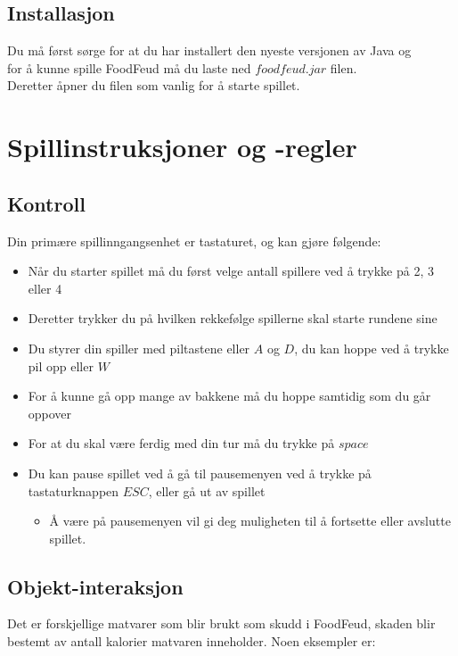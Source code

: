 \documentclass[paper=a4]{article}
\begin{document}
\subsection{Installasjon}
Du må først sørge for at du har installert den nyeste versjonen av Java og \\
for å kunne spille FoodFeud må du laste ned $foodfeud.jar$ filen. \\
Deretter åpner du filen som vanlig for å starte spillet.  
\newpage

\section{Spillinstruksjoner og -regler}

\subsection{Kontroll}
Din primære spillinngangsenhet er tastaturet, og kan gjøre følgende:
\begin{itemize}
	\item{Når du starter spillet må du først velge antall spillere ved å trykke på 2, 3 eller 4}
	\item{Deretter trykker du på hvilken rekkefølge spillerne skal starte rundene sine}
	\item{Du styrer din spiller med piltastene eller $A$ og $D$, du kan hoppe ved å trykke pil opp eller $W$}
	\item{For å kunne gå opp mange av bakkene må du hoppe samtidig som du går oppover}
	\item{For at du skal være ferdig med din tur må du trykke på $space$}
	\item{Du kan pause spillet ved å gå til pausemenyen ved å trykke på tastaturknappen $ESC$, eller gå ut av spillet}
	\begin{itemize}
		\item{Å være på pausemenyen vil gi deg muligheten til å fortsette eller avslutte spillet.}
	\end{itemize}
\end{itemize}

\subsection{Objekt-interaksjon}
Det er forskjellige matvarer som blir brukt som skudd i FoodFeud, skaden blir bestemt av antall kalorier matvaren inneholder. Noen eksempler er:
\end{document}
